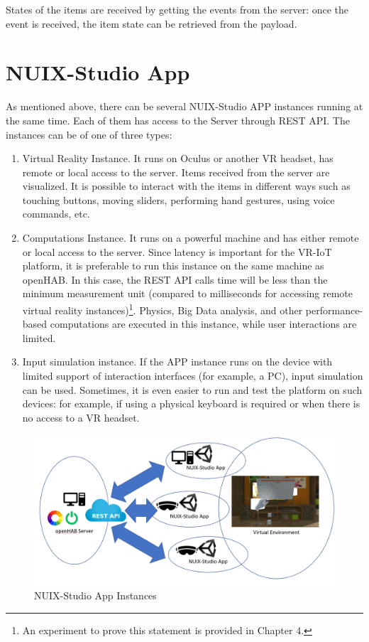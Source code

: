 States of the items are received by getting the events from the server: once the event is received, the item state can be retrieved from the payload.

\section{NUIX-Studio App}

As mentioned above, there can be several NUIX-Studio APP instances running at the same time. Each of them has access to the Server through REST API. The instances can be of one of three types:

\begin{enumerate}
    \item Virtual Reality Instance. It runs on Oculus or another VR headset, has remote or local access to the server. Items received from the server are visualized. It is possible to interact with the items in different ways such as touching buttons, moving sliders, performing hand gestures, using voice commands, etc. 
    \item Computations Instance. It runs on a powerful machine and has either remote or local access to the server. Since latency is important for the VR-IoT platform, it is preferable to run this instance on the same machine as openHAB. In this case, the REST API calls time will be less than the minimum measurement unit (compared to milliseconds for accessing remote virtual reality instances)\footnote{An experiment to prove this statement is provided in Chapter 4.}. Physics, Big Data analysis, and other performance-based computations are executed in this instance, while user interactions are limited.
    \item Input simulation instance. If the APP instance runs on the device with limited support of interaction interfaces (for example, a PC), input simulation can be used. Sometimes, it is even easier to run and test the platform on such devices: for example, if using a physical keyboard is required or when there is no access to a VR headset.
\end{enumerate}

\begin{figure}
  \centering
  \includegraphics[width=0.9\linewidth]{figures/AppInstances.png}
  \caption{NUIX-Studio App Instances}
  \label{fig:AppInstances-figure}
\end{figure}

